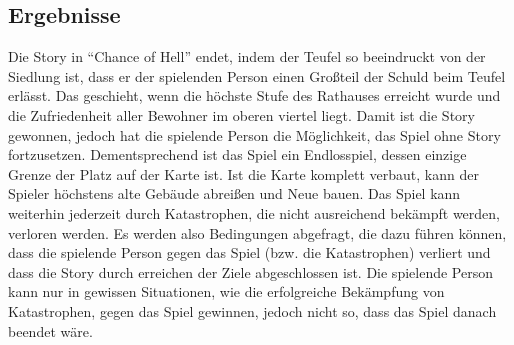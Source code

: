 \documentclass[paper=A4,pagesize=auto,12pt,headinclude=true,footinclude=true,BCOR=0mm,DIV=calc]{scrartcl}
\newcommand{\sectionspace}{
	\vspace{0.5cm}
}
\newcommand{\gametitle}{Chance of Hell}
\begin{document}
\subsection{Ergebnisse}\label{sec:Ergebnisse}
Die Story in "`\gametitle"' endet, indem der Teufel so beeindruckt von der Siedlung ist, dass er der spielenden Person einen Großteil der Schuld beim Teufel erlässt. Das geschieht, wenn die höchste Stufe des Rathauses erreicht wurde und die Zufriedenheit aller Bewohner im oberen viertel liegt. Damit ist die Story gewonnen, jedoch hat die spielende Person die Möglichkeit, das Spiel ohne Story fortzusetzen. Dementsprechend ist das Spiel ein Endlosspiel, dessen einzige Grenze der Platz auf der Karte ist. Ist die Karte komplett verbaut, kann der Spieler höchstens alte Gebäude abreißen und Neue bauen. Das Spiel kann weiterhin jederzeit durch Katastrophen, die nicht ausreichend bekämpft werden, verloren werden.
Es werden also Bedingungen abgefragt, die dazu führen können, dass die spielende Person gegen das Spiel (bzw. die Katastrophen) verliert und dass die Story durch erreichen der Ziele abgeschlossen ist. Die spielende Person kann nur in gewissen Situationen, wie die erfolgreiche Bekämpfung von Katastrophen, gegen das Spiel gewinnen, jedoch nicht so, dass das Spiel danach beendet wäre.


\sectionspace
\newpage
\printbibliography[heading=bibnumbered, title=Referenzen]\label{sec:Referenzen}
\end{document}
